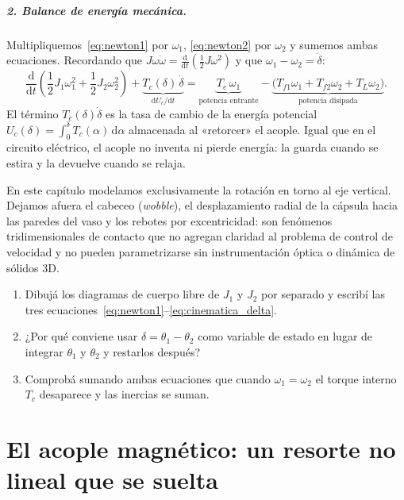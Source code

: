\documentclass[11pt,a4paper,oneside]{book}
\newcommand{\dd}{\mathrm{d}}
\begin{document}
\paragraph{2. Balance de energía mecánica.}
Multipliquemos~\eqref{eq:newton1} por $\omega_1$, \eqref{eq:newton2} por
$\omega_2$ y sumemos ambas ecuaciones. Recordando que
$J\omega\dot\omega = \frac{\dd}{\dd t}(\tfrac{1}{2}J\omega^2)$ y que
$\omega_1 - \omega_2 = \dot\delta$:
\[
  \frac{\dd}{\dd t}\!\left(\frac{1}{2}J_1\omega_1^2 + \frac{1}{2}J_2\omega_2^2\right)
  + \underbrace{T_c(\delta)\,\dot\delta}_{\dd U_c / \dd t}
  = \underbrace{T_e\,\omega_1}_{\text{potencia entrante}}
  - \underbrace{\big(T_{f1}\omega_1 + T_{f2}\omega_2 + T_L\omega_2\big)}_{\text{potencia disipada}}.
\]
El término $T_c(\delta)\dot\delta$ es la tasa de cambio de la energía potencial
$U_c(\delta) = \int_0^\delta T_c(\alpha)\,\dd\alpha$ almacenada al «retorcer» el
acople. Igual que en el circuito eléctrico, el acople no inventa ni pierde
energía: la guarda cuando se estira y la devuelve cuando se relaja.

\begin{antidoto}
En este capítulo modelamos exclusivamente la rotación en torno al eje vertical.
Dejamos afuera el cabeceo (\emph{wobble}), el desplazamiento radial de la
cápsula hacia las paredes del vaso y los rebotes por excentricidad: son
fenómenos tridimensionales de contacto que no agregan claridad al problema de
control de velocidad y no pueden parametrizarse sin instrumentación óptica o
dinámica de sólidos 3D.
\end{antidoto}

\begin{lapizypapel}
\begin{enumerate}[leftmargin=1.5em]
  \item Dibujá los diagramas de cuerpo libre de $J_1$ y $J_2$ por separado y
        escribí las tres ecuaciones~\eqref{eq:newton1}--\eqref{eq:cinematica_delta}.
  \item ¿Por qué conviene usar $\delta = \theta_1 - \theta_2$ como variable de
        estado en lugar de integrar $\theta_1$ y $\theta_2$ y restarlos después?
  \item Comprobá sumando ambas ecuaciones que cuando $\omega_1 = \omega_2$ el
        torque interno $T_c$ desaparece y las inercias se suman.
\end{enumerate}
\end{lapizypapel}

\chapter{El acople magnético: un resorte no lineal que se suelta}\label{cap:acople}
\end{document}
